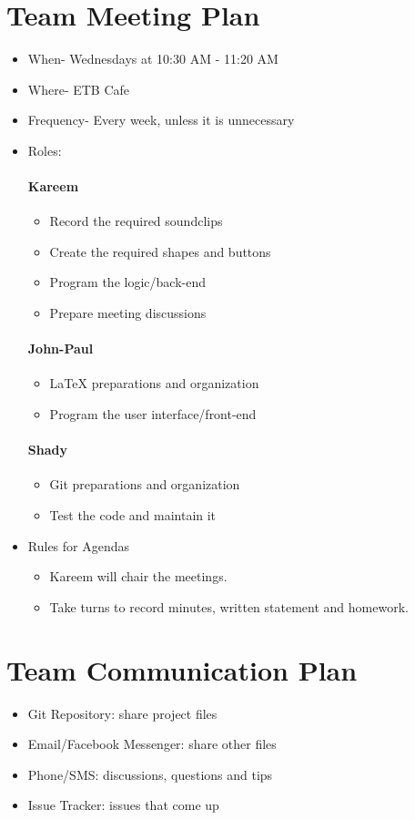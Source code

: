 \documentclass{article}
\begin{document}
\section{Team Meeting Plan}
\begin{itemize}
\item When- Wednesdays at 10:30 AM - 11:20 AM
\item Where- ETB Cafe
\item Frequency- Every week, unless it is unnecessary 
\item Roles:
\paragraph{Kareem}
\begin{itemize}
\item Record the required soundclips
\item Create the required shapes and buttons
\item Program the logic/back-end
\item Prepare meeting discussions
\end{itemize}
\paragraph{John-Paul}
\begin{itemize}
\item LaTeX preparations and organization
\item Program the user interface/front-end
\end{itemize}
\paragraph{Shady}
\begin{itemize}
\item Git preparations and organization
\item Test the code and maintain it
\end{itemize}
\item Rules for Agendas
\begin{itemize}
\item Kareem will chair the meetings.
\item Take turns to record minutes, written statement and homework.
\end{itemize}
\end{itemize}
\section{Team Communication Plan}
\begin{itemize}
\item Git Repository: share project files
\item Email/Facebook Messenger: share other files
\item Phone/SMS: discussions, questions and tips
\item Issue Tracker: issues that come up
\end{itemize}
\end{document}
